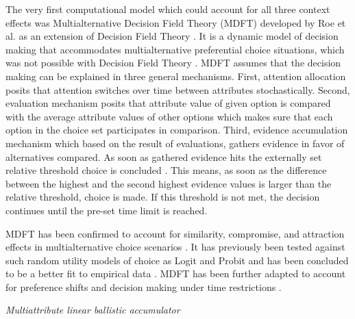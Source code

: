 \documentclass[a4paper,12pt]{article}
\newcommand{\citeyearonly}[1]{\citeyearpar{#1}}
\begin{document}
The very first computational model which could account for all three context effects was Multialternative Decision Field Theory (MDFT) developed by Roe et al. \citeyearonly{roe2001multialternative} as an extension of Decision Field Theory \citep{busemeyer1993decision}. It is a dynamic model of decision making that accommodates multialternative preferential choice situations, which was not possible with Decision Field Theory \citep{hotaling2019quantitative}. MDFT assumes that the decision making can be explained in three general mechanisms. First, attention allocation posits that attention switches over time between attributes stochastically. Second, evaluation mechanism posits that attribute value of given option is compared with the average attribute values of other options  which makes sure that each option in the choice set participates in comparison. Third, evidence accumulation mechanism which based on the result of evaluations, gathers evidence in favor of alternatives compared. As soon as gathered evidence hits the externally set relative threshold choice is concluded \citep{busemeyer2002survey}. This means, as soon as the difference between the highest and the second highest evidence values is larger than the relative threshold, choice is made. If this threshold is not met, the decision continues until the pre-set time limit is reached.

MDFT has been confirmed to account for similarity, compromise, and attraction effects in multialternative choice scenarios \citep{roe2001multialternative}. It has previously been tested against such random utility models of choice as Logit and Probit and has been concluded to be a better fit to empirical data \citep{berkowitsch2014rigorously}. 
MDFT has been further adapted to account for preference shifts \citep{mohr2017attraction} and decision making under time restrictions \citep{diederich2003mdft}.

\textit{Multiattribute linear ballistic accumulator}
\end{document}
